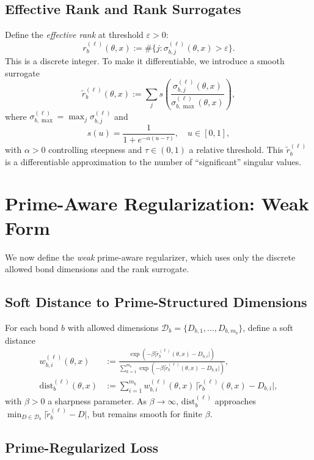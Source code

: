 \documentclass[11pt]{article}
\begin{document}
\subsection{Effective Rank and Rank Surrogates}

Define the \emph{effective rank} at threshold $\varepsilon>0$:
\[
r_b^{(\ell)}(\theta,x)
:= \#\{j: \sigma_{b,j}^{(\ell)}(\theta,x) > \varepsilon\}.
\]
This is a discrete integer. To make it differentiable, we introduce a smooth surrogate
\[
\tilde{r}_b^{(\ell)}(\theta,x)
:= \sum_{j} s\left( \frac{\sigma_{b,j}^{(\ell)}(\theta,x)}{\sigma_{b,\max}^{(\ell)}(\theta,x)}\right),
\]
where $\sigma_{b,\max}^{(\ell)} = \max_j \sigma_{b,j}^{(\ell)}$ and
\[
s(u) = \frac{1}{1 + e^{-\alpha (u - \tau)}},\quad u\in[0,1],
\]
with $\alpha>0$ controlling steepness and $\tau\in(0,1)$ a relative threshold. This $\tilde{r}_b^{(\ell)}$ is a differentiable approximation to the number of ``significant'' singular values.

\section{Prime-Aware Regularization: Weak Form}

We now define the \emph{weak} prime-aware regularizer, which uses only the discrete allowed bond dimensions and the rank surrogate.

\subsection{Soft Distance to Prime-Structured Dimensions}

For each bond $b$ with allowed dimensions $\mathcal{D}_b = \{D_{b,1},\dots,D_{b,m_b}\}$, define a soft distance
\begin{align*}
w_{b,i}^{(\ell)}(\theta,x)
&:= \frac{\exp(-\beta \lvert \tilde{r}_b^{(\ell)}(\theta,x) - D_{b,i}\rvert)}
{\sum_{k=1}^{m_b} \exp(-\beta \lvert \tilde{r}_b^{(\ell)}(\theta,x) - D_{b,k}\rvert)},\\
\mathrm{dist}_b^{(\ell)}(\theta,x)
&:= \sum_{i=1}^{m_b}
w_{b,i}^{(\ell)}(\theta,x)\,\lvert \tilde{r}_b^{(\ell)}(\theta,x) - D_{b,i}\rvert,
\end{align*}
with $\beta>0$ a sharpness parameter. As $\beta\to\infty$, $\mathrm{dist}_b^{(\ell)}$ approaches $\min_{D\in\mathcal{D}_b} \lvert \tilde{r}_b^{(\ell)} - D\rvert$, but remains smooth for finite $\beta$.

\subsection{Prime-Regularized Loss}
\end{document}
